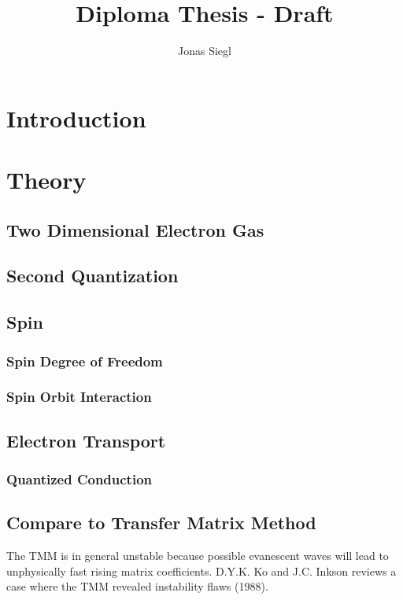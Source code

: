 
\author{Jonas Siegl}
\title{Diploma Thesis - Draft}




\maketitle
% 

\clearpage
\thispagestyle{empty}
\mbox{}
\clearpage
\thispagestyle{plain} %
\tableofcontents
\clearpage
\section{Introduction}
\section{Theory}
  \subsection{Two Dimensional Electron Gas}
  \subsection{Second Quantization}
  \subsection{Spin}
    \subsubsection{Spin Degree of Freedom}
    \subsubsection{Spin Orbit Interaction}
  \subsection{Electron Transport}
    \subsubsection{Quantized Conduction}
  \subsection{Compare to Transfer Matrix Method}
  The TMM is in general unstable because possible evanescent waves will lead to unphysically fast rising matrix coefficients.
  D.Y.K. Ko and J.C. Inkson reviews a case where the TMM revealed instability flaws (1988).
